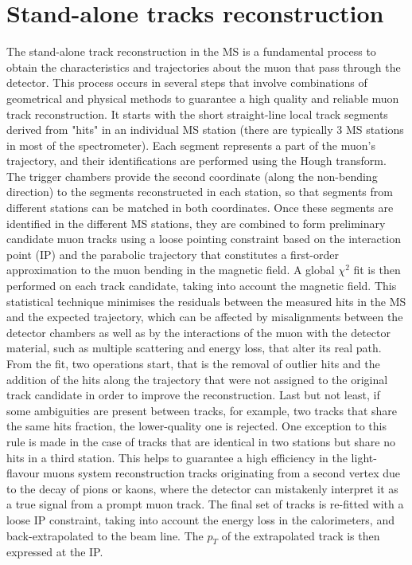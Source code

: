 \documentclass[11pt,a4paper,twoside,openright]{report}
\begin{document}
\section{Stand-alone tracks reconstruction}
The stand-alone track reconstruction in the MS is a fundamental process to obtain the characteristics and trajectories about the muon that pass through the detector. This process occurs in several steps that involve combinations of geometrical and physical methods to guarantee a high quality and reliable muon track reconstruction. It starts with the short straight-line local track segments derived from "hits" in an individual MS station (there are typically 3 MS stations in most of the spectrometer). Each segment represents a part of the muon's trajectory, and their identifications are performed using the Hough transform. The trigger chambers provide the second coordinate (along the non-bending direction) to the segments reconstructed in each station, so that segments from different stations can be matched in both coordinates. Once these segments are identified in the different MS stations, they are combined to form preliminary candidate muon tracks using a loose pointing constraint based on the interaction point (IP) and the parabolic trajectory that constitutes a first-order approximation to the muon bending in the magnetic field. A global \(\chi^{2}\) fit is then performed on each track candidate, taking into account the magnetic field. This statistical technique minimises the residuals between the measured hits in the MS and the expected trajectory, which can be affected by misalignments between the detector chambers as well as by the interactions of the muon with the detector material, such as multiple scattering and energy loss, that alter its real path. From the fit, two operations start, that is the removal of outlier hits and the addition of the hits along the trajectory that were not assigned to the original track candidate in order to improve the reconstruction. Last but not least, if some ambiguities are present between tracks, for example, two tracks that share the same hits fraction, the lower-quality one is rejected. One exception to this rule is made in the case of tracks that are identical in two stations but share no hits in a third station. This helps to guarantee a high efficiency in the light-flavour muons system reconstruction tracks originating from a second vertex due to the decay of pions or kaons, where the detector can mistakenly interpret it as a true signal from a prompt muon track. The final set of tracks is re-fitted with a loose IP constraint, taking into account the energy loss in the calorimeters, and back-extrapolated to the beam line. The \(p_{T}\) of the extrapolated track is then expressed at the IP.
\end{document}
